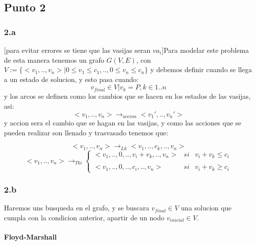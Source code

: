 \documentclass{article}
\begin{document}
\subsection*{Punto 2}

\subsubsection*{2.a}
[para evitar errores se tiene que las vasijas seran $va_i$]Para modelar este problema de esta manera tenemos un grafo $G(V,E)$, con $V:= \{<v_1,..,v_n>|0\leq v_1 \leq c_1,..,0\leq v_n \leq c_n\}$ y debemos definir cuando se llega a un estado de solucion, y esto pasa cuando:
\begin{equation}
v_{final}\in V| v_k=P, k\in {1..n}
\end{equation}
y los arcos se definen como los cambios que se hacen en los estados de las vasijas, asi:
\begin{equation}
<v_1,..,v_n>\rightarrow_{accion} <v_1',..,v_n'>
\end{equation}
y accion sera el cambio que se hagan en las vasijas, y como las acciones que se pueden realizar son llenado y trasvasado tenemos que:

\begin{equation}
<v_1,..,v_n>\rightarrow_{Lk} <v_1,..,c_k,..,v_n>
\end{equation}
\begin{equation}
<v_1,..,v_n>\rightarrow_{Tki} \left\{ \begin{array}{lcc}
             <v_1,..,0,..,v_i+v_k,..,v_n> &   si  & v_i+v_k\leq c_i \\
             \\ <v_1,..,0,..,c_i,..,v_n> &  si & v_i+v_k\geq c_i 
              
             \end{array}
   \right.
\end{equation}
\subsubsection*{2.b}
Haremos uns busqueda en el grafo, y se buscara $v_{final} \in V$ una solucion que cumpla con la condicion anterior, apartir de un nodo $v_{inicial} \in V$.
\paragraph{Floyd-Marshall}
\end{document}
